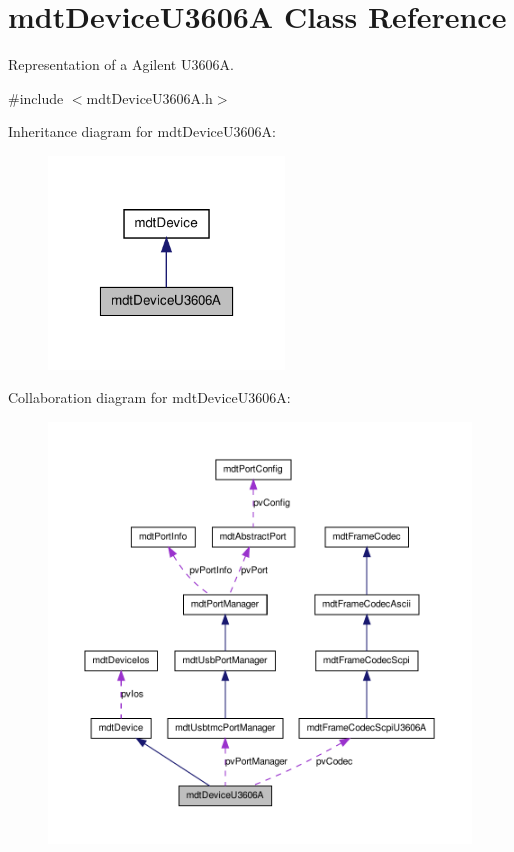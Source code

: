 \hypertarget{classmdt_device_u3606_a}{
\section{mdtDeviceU3606A Class Reference}
\label{classmdt_device_u3606_a}
}


Representation of a Agilent U3606A.  




{\ttfamily \#include $<$mdtDeviceU3606A.h$>$}



Inheritance diagram for mdtDeviceU3606A:\nopagebreak
\begin{figure}[H]
\begin{center}
\leavevmode
\includegraphics[width=178pt]{classmdt_device_u3606_a__inherit__graph}
\end{center}
\end{figure}


Collaboration diagram for mdtDeviceU3606A:
\nopagebreak
\begin{figure}[H]
\begin{center}
\leavevmode
\includegraphics[width=400pt]{classmdt_device_u3606_a__coll__graph}
\end{center}
\end{figure}
